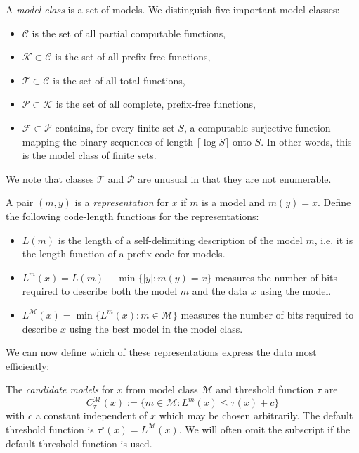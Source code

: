 \documentclass{style/llncs}
\newcommand{\M}{\mathscr M}
\newcommand{\C}{\mathscr C}
\newcommand{\T}{\mathscr T}
\newcommand{\F}{\mathscr F}
\renewcommand{\P}{\mathscr P}
\newcommand{\K}{\mathscr K}
\begin{document}
\begin{definition} A \emph{model class} is a set of models. We distinguish five important model classes:
  \begin{itemize}
  \item $\C$ is the set of all partial computable functions,
  \item $\K\subset\C$ is the set of all prefix-free
    functions,
  \item $\T\subset\C$ is the set of all total functions,
  \item $\P\subset\K$ is the set of all complete, prefix-free functions,
  \item $\F\subset\P$ contains, for every finite set $S$, a computable
    surjective function mapping the binary sequences of length
    $\lceil\log S\rceil$ onto $S$. In other words, this is the model class of finite sets.
  \end{itemize}
\end{definition}
We note that classes $\T$ and $\P$ are unusual in that they are not enumerable.
\begin{definition}
A pair $(m,y)$ is a \emph{representation} for $x$ if $m$ is a model and $m(y)=x$.
Define the following code-length functions for the representations:
\begin{itemize}
\item $L(m)$ is the length of a self-delimiting description of
  the model $m$, i.e. it is the length function of a prefix code for models. 
\item $L^m(x)=L(m)+\min\{|y|:m(y)=x\}$ measures the number of bits required to describe both the model $m$ and the data $x$ using the model.
\item $L^\M(x)=\min\{L^m(x):m\in\M\}$ measures the number of bits
  required to describe $x$ using the best model in the model class.
\end{itemize}
\end{definition}
We can now define which of these representations express the data most efficiently:
\begin{definition}
The \emph{candidate models} for $x$ from model class $\M$ and threshold function $\tau$ are
\[
  C^\M_\tau(x):=\{m\in\M:L^m(x)\le \tau(x) + c\}
\]
with $c$ a constant independent of $x$ which may be chosen arbitrarily. The default threshold function is $\tau^\circ(x)=L^\M(x)$. We will often omit the subscript if the default threshold function is used. 
\end{definition}
\end{document}

